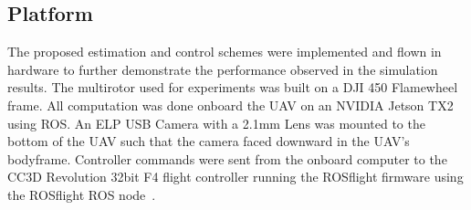 
\subsection{Platform}
The proposed estimation and control schemes were implemented and flown in
hardware to further demonstrate the performance observed in the simulation
results. The multirotor used for experiments was built on a DJI 450 Flamewheel
frame. All computation was done onboard the UAV on an NVIDIA Jetson TX2 using
ROS. An ELP
USB Camera with a 2.1mm Lens was mounted to the bottom of the UAV such that the
camera faced downward in the UAV's bodyframe. Controller commands were sent from
the onboard computer to the CC3D Revolution 32bit F4 flight controller running
the ROSflight firmware using the ROSflight ROS node~\cite{jackson2016rosflight}.

